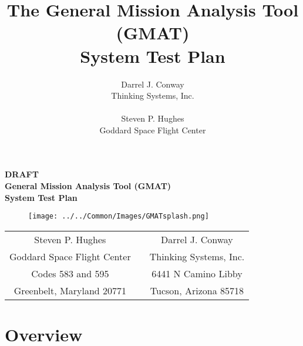 \documentclass[letterpaper,10pt]{book}
\title{The General Mission Analysis Tool (GMAT)\\System Test Plan}
\author{Darrel J. Conway\\Thinking Systems, Inc.\\ \\Steven P. Hughes\\Goddard Space Flight Center}
\begin{document}
\newcommand\chapauthor[1]{\emph{#1}}


\thispagestyle{empty}
\begin{center}
{\renewcommand{\thefootnote}{\fnsymbol{footnote}} { \huge \bf DRAFT
\\General Mission Analysis Tool (GMAT)\\System Test Plan\\}
\vspace{0.1in} }
\end{center}

\begin{figure}[H]
\begin{center}
\texttt{[image: ../../Common/Images/GMATsplash.png]}
\end{center}
\end{figure}

\begin{center}
\begin{tabular}{c c c}
  Steven P. Hughes & & Darrel J. Conway \\
  Goddard Space Flight Center & & Thinking Systems, Inc. \\
  Codes 583 and 595 & \hspace{0.3in} & 6441 N Camino Libby \\
  Greenbelt, Maryland 20771 & & Tucson, Arizona 85718 \\
\end{tabular}

\vspace{0.1in}{\today}

\end{center}

\clearpage \clearpage

\thispagestyle{empty}

\tableofcontents
\clearpage
\listoffigures
\clearpage

\part{Overview}
\thispagestyle{empty}
\end{document}
